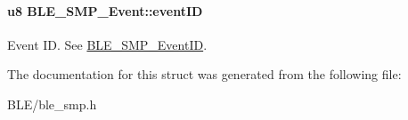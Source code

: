 \paragraph[{\texorpdfstring{event\+ID}{eventID}}]{\setlength{\rightskip}{0pt plus 5cm}u8 B\+L\+E\+\_\+\+S\+M\+P\+\_\+\+Event\+::event\+ID}\hypertarget{struct_b_l_e___s_m_p___event_a3a6d332f1044b7ca8a79b36c8d4f68e3}{}\label{struct_b_l_e___s_m_p___event_a3a6d332f1044b7ca8a79b36c8d4f68e3}
Event ID. See \hyperlink{group___b_l_e___s_m_p_ga4b348bac282c69fdb7a248c83a3e55dd}{B\+L\+E\+\_\+\+S\+M\+P\+\_\+\+Event\+ID}. 

The documentation for this struct was generated from the following file\+:\begin{DoxyCompactItemize}
\item 
B\+L\+E/ble\+\_\+smp.\+h\end{DoxyCompactItemize}
